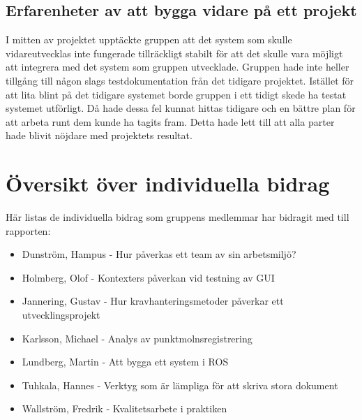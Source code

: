 \subsection{Erfarenheter av att bygga vidare på ett projekt}

I mitten av projektet upptäckte gruppen att det system som skulle vidareutvecklas inte fungerade tillräckligt stabilt för att det skulle vara möjligt att integrera med det system som gruppen utvecklade. Gruppen hade inte heller tillgång till någon slags testdokumentation från det tidigare projektet. Istället för att lita blint på det tidigare systemet borde gruppen i ett tidigt skede ha testat systemet utförligt. Då hade dessa fel kunnat hittas tidigare och en bättre plan för att arbeta runt dem kunde ha tagits fram. Detta hade lett till att alla parter hade blivit nöjdare med projektets resultat.




\section{Översikt över individuella bidrag}

Här listas de individuella bidrag som gruppens medlemmar har bidragit med till rapporten:

\begin{itemize}
	\item Dunström, Hampus - Hur påverkas ett team av sin arbetsmiljö?
	\item Holmberg, Olof - Kontexters påverkan vid testning av GUI
	\item Jannering, Gustav - Hur kravhanteringsmetoder påverkar ett utvecklingsprojekt
	\item Karlsson, Michael - Analys av punktmolnsregistrering
	\item Lundberg, Martin - Att bygga ett system i ROS
	\item Tuhkala, Hannes - Verktyg som är lämpliga för att skriva stora dokument
	\item Wallström, Fredrik - Kvalitetsarbete i praktiken
\end{itemize}


